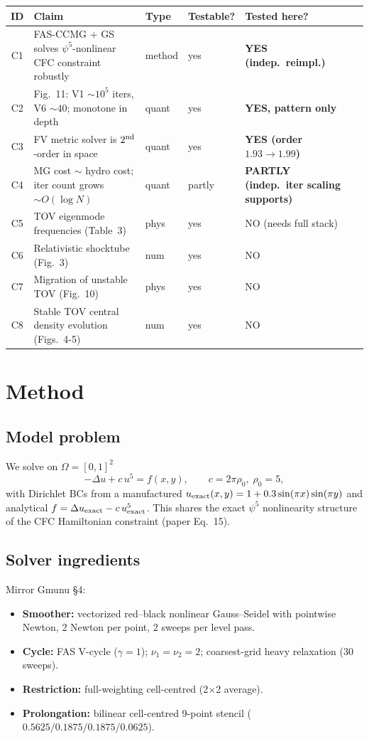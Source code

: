 \documentclass[11pt]{article}
\begin{document}
\begin{center}\small
\begin{tabular}{@{}clllll@{}}
\toprule
ID & Claim & Type & Testable? & Tested here? \\ \midrule
C1 & FAS-CCMG + GS solves $\psi^5$-nonlinear CFC constraint robustly & method & yes & \textbf{YES (indep.\ reimpl.)} \\
C2 & Fig.~11: V1 $\sim 10^5$ iters, V6 $\sim 40$; monotone in depth & quant & yes & \textbf{YES, pattern only} \\
C3 & FV metric solver is $2^{\rm nd}$-order in space & quant & yes & \textbf{YES (order $1.93\to1.99$)} \\
C4 & MG cost $\sim$ hydro cost; iter count grows $\sim O(\log N)$ & quant & partly & \textbf{PARTLY (indep.\ iter scaling supports)} \\
C5 & TOV eigenmode frequencies (Table~3) & phys & yes & NO (needs full stack) \\
C6 & Relativistic shocktube (Fig.~3) & num & yes & NO \\
C7 & Migration of unstable TOV (Fig.~10) & phys & yes & NO \\
C8 & Stable TOV central density evolution (Figs.~4-5) & num & yes & NO \\
\bottomrule
\end{tabular}
\end{center}

\section{Method}

\subsection{Model problem}
We solve on $\Omega = [0,1]^2$
\[
-\Delta u + c\, u^5 = f(x,y), \qquad c = 2\pi\rho_0,\; \rho_0 = 5,
\]
with Dirichlet BCs from a manufactured $u_{\rm exact}(x,y) = 1 + 0.3\sin(\pi x)\sin(\pi y)$ and analytical $f = \Delta u_{\rm exact} - c\,u_{\rm exact}^5$. This shares the exact $\psi^5$ nonlinearity structure of the CFC Hamiltonian constraint (paper Eq.~15).

\subsection{Solver ingredients}
Mirror Gmunu \S 4:
\begin{itemize}
  \item \textbf{Smoother:} vectorized red--black nonlinear Gauss--Seidel with pointwise Newton, 2 Newton per point, 2 sweeps per level pass.
  \item \textbf{Cycle:} FAS V-cycle ($\gamma = 1$); $\nu_1=\nu_2=2$; coarsest-grid heavy relaxation (30 sweeps).
  \item \textbf{Restriction:} full-weighting cell-centred (2$\times$2 average).
  \item \textbf{Prolongation:} bilinear cell-centred 9-point stencil ($0.5625/0.1875/0.1875/0.0625$).
\end{itemize}
\end{document}
